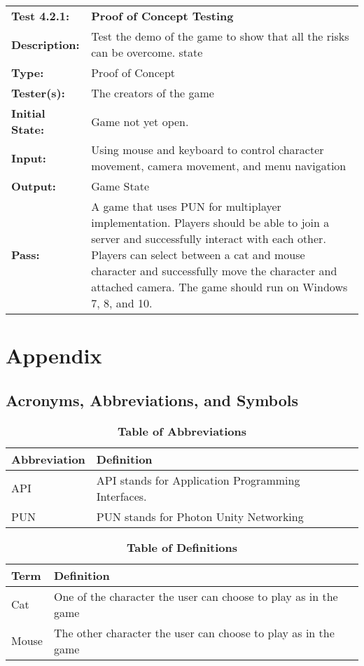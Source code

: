 \documentclass[12pt, titlepage]{article}
\begin{document}
\begin{mdframed}[linewidth=1pt]
\begin{tabularx}{\textwidth}{@{}p{3cm}X@{}}
{\bf Test 4.2.1:} & {\bf Proof of Concept Testing}\\[\baselineskip]
{\bf Description:} & Test the demo of the game to show that all the risks can be overcome. state\\[0.5\baselineskip]
{\bf Type:} & Proof of Concept\\[0.5\baselineskip]
{\bf Tester(s):} & The creators of the game\\[0.5\baselineskip]
{\bf Initial State:} & Game not yet open.\\[0.5\baselineskip]
{\bf Input:} & Using mouse and keyboard to control character movement, camera movement, and menu navigation\\[0.5\baselineskip]
{\bf Output:} & Game State\\[0.5\baselineskip]
{\bf Pass:} & A game that uses PUN for multiplayer implementation. Players should be able to join a server and successfully interact with each other. Players can select between a cat and mouse character and successfully move the character and attached camera. The game should run on Windows 7, 8, and 10.
\end{tabularx}
\end{mdframed}


\newpage

\section{Appendix}

\subsection{Acronyms, Abbreviations, and Symbols}
	
\begin{table}[hbp]
\caption{\textbf{Table of Abbreviations}} \label{Table}
\begin{tabularx}{\textwidth}{p{3cm}X}
\toprule
\textbf{Abbreviation} & \textbf{Definition} \\
\midrule
API & API stands for Application Programming Interfaces.\\
PUN & PUN stands for Photon Unity Networking\\
\bottomrule
\end{tabularx}
\end{table}
\begin{table}[!htbp]
\caption{\textbf{Table of Definitions}} \label{Table}
\begin{tabularx}{\textwidth}{p{3cm}X}
\toprule
\textbf{Term} & \textbf{Definition}\\
\midrule
Cat & One of the character the user can choose to play as in the game\\
Mouse & The other character the user can choose to play as in the game\\
\bottomrule
\end{tabularx}
\end{table}	
\end{document}

